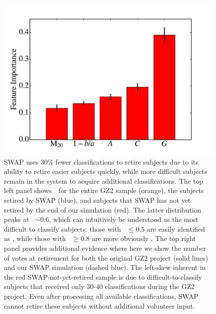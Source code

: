\begin{figure}
\includegraphics[width=\linewidth]{Figures/human_machine/f14.pdf}
\caption[SWAP increase classification efficiency by retiring ``easy'' galaxies quickly.]{SWAP uses 30\% fewer classifications to retire subjects due to its ability to retire easier subjects quickly, while more difficult subjects remain in the system to acquire additional classifications. The top left panel shows~\fsmooth~for the entire GZ2 sample (orange), the subjects retired by SWAP (blue), and subjects that SWAP has not yet retired by the end of our simulation (red). The latter distribution peaks at \fsmooth~$\sim 0.6$, which can intuitively be understood as the most difficult to classify subjects: those with \fsmooth~$\le 0.5$ are easily identified as \feat, while those with \fsmooth~$\ge 0.8$ are more obviously \notfeat. The top right panel provides additional evidence where here we show the number of votes at retirement for both the original GZ2 project (solid lines) and our SWAP simulation (dashed blue). The left-skew inherent in the red SWAP-not-yet-retired sample is due to difficult-to-classify subjects that received only 30-40 classifications during the GZ2 project. Even after processing all available classifications, SWAP cannot retire these subjects without additional volunteer input. }
\label{fig: swap retirement}
\end{figure}

